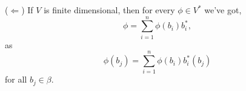 ($\Leftarrow$) If $V$ is finite dimensional, then for every $\phi \in V^*$ we've got,
$$\phi = \sum_{i=1}^{n} \phi(b_i)b_i^*,$$
as $$\phi(b_j) = \sum_{i=1}^{n} \phi(b_i) b_i^* (b_j)$$ for all $b_j \in \beta$.
